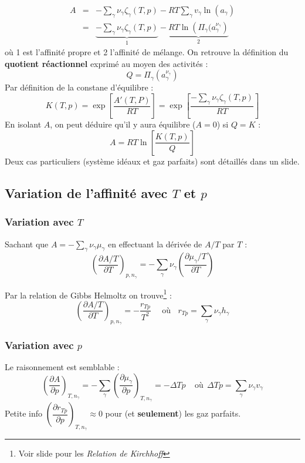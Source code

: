 \documentclass[11pt, a4paper, openany]{book}
\begin{document}
		\begin{eqnarray}
			A &=& - \sum_\gamma \nu_\gamma\zeta_\gamma(T,p) - RT\sum_\gamma v_\gamma \ln(a_\gamma)\\
			&=& \underbrace{-\sum_\gamma \nu_\gamma\zeta_\gamma(T,p)}_1 -\underbrace{RT\ln\left(\Pi_\gamma(a_\gamma^{\nu_\gamma}\right)}_2
		\end{eqnarray}
		où 1 est l'affinité propre et 2 l'affinité de mélange. On retrouve la définition du \textbf{quotient réactionnel} exprimé au moyen des activités : 
		\begin{equation}
			Q = \Pi_\gamma \left(a_\gamma^{\nu_\gamma}\right)
		\end{equation}
		Par définition de la constane d'équilibre : 
		\begin{equation}
			K(T,p) = \exp\left[\dfrac{A'(T,P)}{RT}\right] = \exp\left[\dfrac{-\sum_\gamma  \nu_\gamma \zeta_\gamma(T,p) }{RT} \right]
		\end{equation} 
		En isolant $A$, on peut déduire qu'il y aura équilibre ($A = 0$) si $Q = K$ :
		\begin{equation}
			A = RT \ln\left[\frac{K(T,p)}{Q} \right]
		\end{equation}
		Deux cas particuliers (système idéaux et gaz parfaits) sont détaillés dans un slide.
		
		\subsection{Variation de l'affinité avec $T$ et $p$}
		\subsubsection{Variation avec $T$}
		Sachant que $A = -\sum_\gamma \nu_\gamma \mu_\gamma$ en effectuant la dérivée de $A/T$ par $T$ :
		\begin{equation}
			\left(\frac{\partial A/T}{\partial T}\right)_{p,n_\gamma} = - \sum_\gamma \nu_\gamma \left(\dfrac{\partial \mu_\gamma / T}{\partial T}\right)
		\end{equation}
		
		Par la relation de Gibbs Helmoltz on trouve\footnote{Voir slide pour les \textit{Relation de Kirchhoff}} :
		\begin{equation}
			\left(\frac{\partial A/T}{\partial T}\right)_{p,n_\gamma} = -\dfrac{r_{Tp}}{T^2}\ \ \ \ \ \ \text{où}\  \ \ \ r_{Tp} = \sum_\gamma \nu_\gamma h_\gamma
		\end{equation}
		
		\subsubsection{Variation avec $p$}
		Le raisonnement est semblable :
		\begin{equation}
			\left(\dfrac{\partial A}{\partial p}\right)_{T, n_\gamma} = - \sum_\gamma \left(\dfrac{\partial \mu_\gamma}{\partial p}\right)_{T, n_\gamma} = -\Delta Tp\ \ \ \ \ \text{où}\ \ \Delta Tp = \sum_\gamma \nu_\gamma v_\gamma
		\end{equation}
		Petite info $\left(\dfrac{\partial r_{Tp}}{\partial p}\right)_{T, n_\gamma} \approx 0$ pour (et \textbf{seulement}) les gaz parfaits.\\
		
\end{document}

